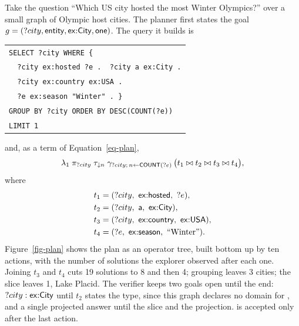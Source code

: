 \begin{example}
\label{exa-plan}
Take the question ``Which US city hosted the most Winter Olympics?''
over a small graph of Olympic host cities.
The planner first states the goal $g = (?city, {\mathsf{entity}},
{\mathsf{ex{:}City}}, {\mathsf{one}})$.
The query it builds is
\begin{center}
\footnotesize
\begin{tabular}{@{}l@{}}
\texttt{SELECT ?city WHERE \{}\\
\texttt{\ \ ?city ex:hosted ?e . \ ?city a ex:City .}\\
\texttt{\ \ ?city ex:country ex:USA .}\\
\texttt{\ \ ?e ex:season "Winter" . \}}\\
\texttt{GROUP BY ?city ORDER BY DESC(COUNT(?e))}\\
\texttt{LIMIT 1}
\end{tabular}
\end{center}
and, as a term of Equation~\eqref{eq-plan},
\[
\lambda_{1}\; \pi_{?city}\; \tau_{\downarrow n}\;
\gamma_{?city;\, n \leftarrow {\ensuremath{\mathsf{COUNT}}}(?e)}\,
\bigl(t_1 \bowtie t_2 \bowtie t_3 \bowtie t_4\bigr),
\]
where
\begin{align*}
t_1 &= (?city,\ {\mathsf{ex{:}hosted}},\ ?e),\\
t_2 &= (?city,\ {\mathsf{a}},\ {\mathsf{ex{:}City}}),\\
t_3 &= (?city,\ {\mathsf{ex{:}country}},\ {\mathsf{ex{:}USA}}),\\
t_4 &= (?e,\ {\mathsf{ex{:}season}},\ \text{``Winter''}).
\end{align*}
Figure~\ref{fig-plan} shows the plan as an operator tree, built bottom
up by ten actions, with the number of solutions the explorer observed
after each one.
Joining $t_3$ and $t_4$ cuts 19 solutions to 8 and then 4; grouping
leaves 3 cities; the slice leaves 1, Lake Placid.
The verifier keeps two goals open until the end: $?city : {\mathsf{ex{:}City}}$
until $t_2$ states the type, since this graph declares no domain for
, and a single projected answer until the slice and the
projection.
 is accepted only after the last action.
\end{example}

